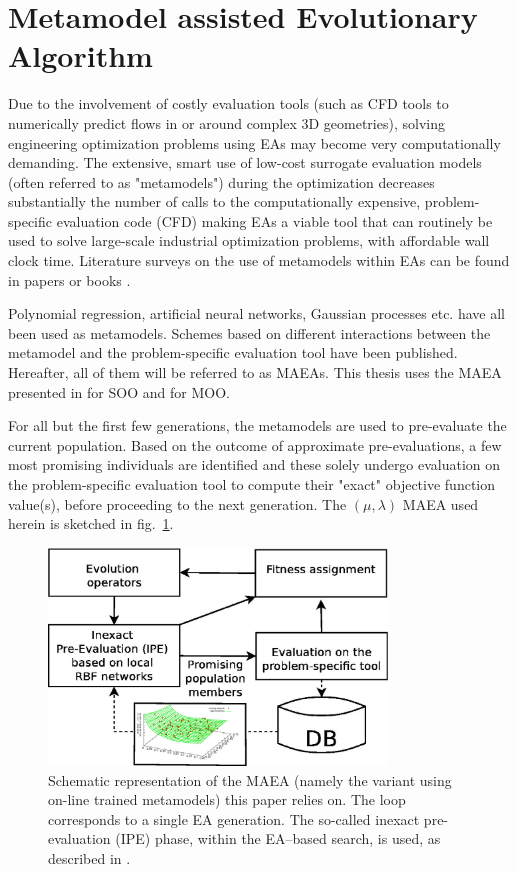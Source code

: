 \section{Metamodel assisted Evolutionary Algorithm}

Due to the involvement of costly evaluation tools (such as CFD tools to numerically predict flows in or around complex 3D geometries), solving engineering optimization problems using EAs may become very computationally demanding. The extensive, smart use of low-cost surrogate evaluation models (often referred to as "metamodels") during the optimization decreases substantially the number of calls to the computationally expensive, problem-specific evaluation code (CFD) making EAs a viable tool that can routinely be used to solve large-scale industrial optimization problems, with affordable wall clock time. Literature surveys on the use of metamodels within EAs can be found in papers \cite{LTT_2_020,Jin2002,LTT_2_027} or books \cite{KEANEbook}.


Polynomial regression, artificial neural networks, Gaussian processes etc. have all been used as metamodels.  Schemes based on different interactions between the metamodel and the problem-specific evaluation tool have been published. Hereafter, all of them will be referred to as MAEAs. This thesis uses the MAEA presented in \cite{LTT_2_018} for SOO and \cite{LTT_2_029} for MOO. 

For all but the first few generations, the metamodels are used to pre-evaluate the current population. Based on the outcome of approximate pre-evaluations, a few most promising individuals are identified and these solely undergo evaluation on the problem-specific evaluation tool to compute their "exact" objective function value(s), before proceeding to the next generation. The $(\mu,\lambda)$ MAEA used herein is sketched in fig.~\ref{MAEA}.


\begin{figure}[h!]
\centering
\includegraphics[width=90mm]{MAEA.eps} 
\caption{Schematic representation of the MAEA (namely the variant using on-line trained metamodels) this paper relies on. The loop corresponds to a single EA generation. The so-called inexact pre-evaluation (IPE) phase, within the EA--based search, is used, as described in \cite{LTT_2_020,LTT_2_029}. }
\label{MAEA}
\end{figure}


